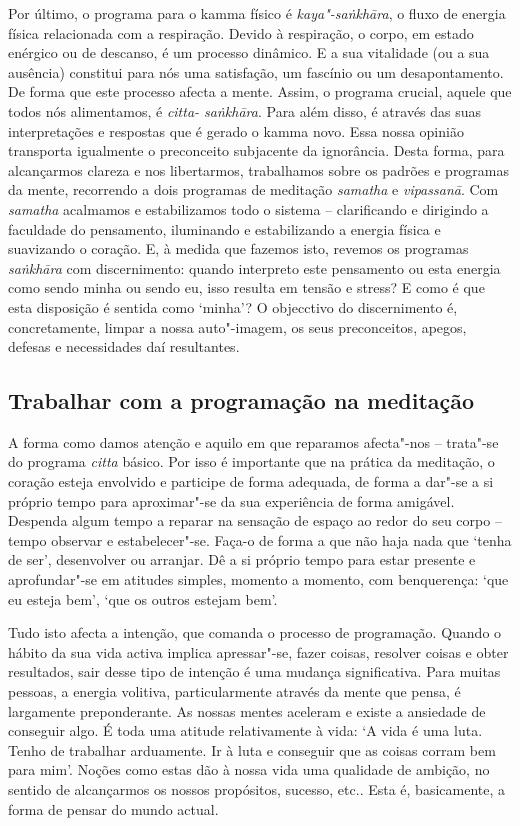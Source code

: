 \enlargethispage{\baselineskip}

Por último, o programa para o kamma físico é \emph{kaya"-saṅkhāra}, o fluxo de
energia física relacionada com a respiração. Devido à respiração, o corpo, em
estado enérgico ou de descanso, é um processo dinâmico. E a sua vitalidade (ou a
sua ausência) constitui para nós uma satisfação, um fascínio ou um
desapontamento. De forma que este processo afecta a mente. Assim, o programa
crucial, aquele que todos nós alimentamos, é \emph{citta- saṅkhāra}. Para além
disso, é através das suas interpretações e respostas que é gerado o kamma novo.
Essa nossa opinião transporta igualmente o preconceito subjacente da ignorância.
Desta forma, para alcançarmos clareza e nos libertarmos, trabalhamos sobre os
padrões e programas da mente, recorrendo a dois programas de meditação
\emph{samatha} e \emph{vipassanā}. Com \emph{samatha} acalmamos e estabilizamos
todo o sistema -- clarificando e dirigindo a faculdade do pensamento, iluminando
e estabilizando a energia física e suavizando o coração. E, à medida que fazemos
isto, revemos os programas \emph{saṅkhāra} com discernimento: quando interpreto
este pensamento ou esta energia como sendo minha ou sendo eu, isso resulta em
tensão e stress? E como é que esta disposição é sentida como `minha'? O
objecctivo do discernimento é, concretamente, limpar a nossa auto"-imagem, os
seus preconceitos, apegos, defesas e necessidades daí resultantes.

\subsection{Trabalhar com a programação na meditação}

A forma como damos atenção e aquilo em que reparamos afecta"-nos -- trata"-se do
programa \emph{citta} básico. Por isso é importante que na prática da meditação,
o coração esteja envolvido e participe de forma adequada, de forma a dar"-se a si
próprio tempo para aproximar"-se da sua experiência de forma amigável. Despenda
algum tempo a reparar na sensação de espaço ao redor do seu corpo -- tempo
observar e estabelecer"-se. Faça-o de forma a que não haja nada que `tenha de
ser', desenvolver ou arranjar. Dê a si próprio tempo para estar presente e
aprofundar"-se em atitudes simples, momento a momento, com benquerença: `que eu
esteja bem', `que os outros estejam bem'.

Tudo isto afecta a intenção, que comanda o processo de programação. Quando o
hábito da sua vida activa implica apressar"-se, fazer coisas, resolver coisas e
obter resultados, sair desse tipo de intenção é uma mudança significativa. Para
muitas pessoas, a energia volitiva, particularmente através da mente que pensa,
é largamente preponderante. As nossas mentes aceleram e existe a ansiedade de
conseguir algo. É toda uma atitude relativamente à vida: `A vida é uma luta.
Tenho de trabalhar arduamente. Ir à luta e conseguir que as coisas corram bem
para mim'. Noções como estas dão à nossa vida uma qualidade de ambição, no
sentido de alcançarmos os nossos propósitos, sucesso, etc.. Esta é, basicamente,
a forma de pensar do mundo actual.

